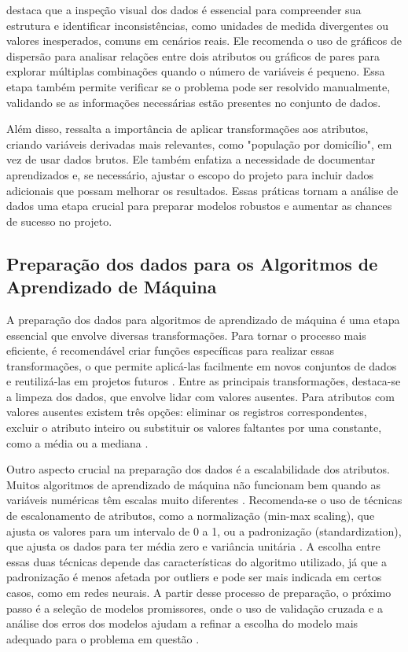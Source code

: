  destaca que a inspeção visual dos dados é essencial para compreender sua estrutura e identificar inconsistências, como unidades de medida divergentes ou valores inesperados, comuns em cenários reais. Ele recomenda o uso de gráficos de dispersão para analisar relações entre dois atributos ou gráficos de pares para explorar múltiplas combinações quando o número de variáveis é pequeno. Essa etapa também permite verificar se o problema pode ser resolvido manualmente, validando se as informações necessárias estão presentes no conjunto de dados.

Além disso, ressalta a importância de aplicar transformações aos atributos, criando variáveis derivadas mais relevantes, como "população por domicílio", em vez de usar dados brutos. Ele também enfatiza a necessidade de documentar aprendizados e, se necessário, ajustar o escopo do projeto para incluir dados adicionais que possam melhorar os resultados. Essas práticas tornam a análise de dados uma etapa crucial para preparar modelos robustos e aumentar as chances de sucesso no projeto.

\subsection{Preparação dos dados para os Algoritmos de Aprendizado de Máquina}
A preparação dos dados para algoritmos de aprendizado de máquina é uma etapa essencial que envolve diversas transformações. Para tornar o processo mais eficiente, é recomendável criar funções específicas para realizar essas transformações, o que permite aplicá-las facilmente em novos conjuntos de dados e reutilizá-las em projetos futuros \cite{geron2017}. Entre as principais transformações, destaca-se a limpeza dos dados, que envolve lidar com valores ausentes. Para atributos com valores ausentes existem três opções: eliminar os registros correspondentes, excluir o atributo inteiro ou substituir os valores faltantes por uma constante, como a média ou a mediana \cite{geron2017}. 

Outro aspecto crucial na preparação dos dados é a escalabilidade dos atributos. Muitos algoritmos de aprendizado de máquina não funcionam bem quando as variáveis numéricas têm escalas muito diferentes \cite{geron2017}. Recomenda-se o uso de técnicas de escalonamento de atributos, como a normalização (min-max scaling), que ajusta os valores para um intervalo de 0 a 1, ou a padronização (standardization), que ajusta os dados para ter média zero e variância unitária \cite{geron2017}. A escolha entre essas duas técnicas depende das características do algoritmo utilizado, já que a padronização é menos afetada por outliers e pode ser mais indicada em certos casos, como em redes neurais. A partir desse processo de preparação, o próximo passo é a seleção de modelos promissores, onde o uso de validação cruzada e a análise dos erros dos modelos ajudam a refinar a escolha do modelo mais adequado para o problema em questão \cite{geron2017}.

